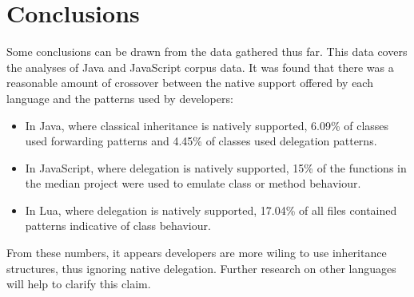 \chapter{Conclusions}\label{C:con}
Some conclusions can be drawn from the data gathered thus far. This data covers the analyses of Java and JavaScript corpus data. It was found that there was a reasonable amount of crossover between the native support offered by each language and the patterns used by developers:
\begin{itemize}
	\item In Java, where classical inheritance is natively supported, 6.09\% of classes used forwarding patterns and 4.45\% of classes used delegation patterns.
	\item In JavaScript, where delegation is natively supported, 15\% of the functions in the median project were used to emulate class or method behaviour.
	\item In Lua, where delegation is natively supported, 17.04\% of all files contained patterns indicative of class behaviour.
\end{itemize}
From these numbers, it appears developers are more wiling to use inheritance structures,  thus ignoring native delegation. Further research on other languages will help to clarify this claim.